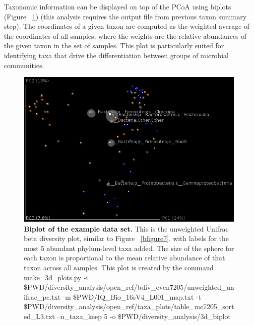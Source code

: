 Taxonomic information can be displayed on top of the PCoA using biplots (Figure ~\ref{bfigure8})
(this analysis requires the output file from previous taxon summary step). The coordinates
of a given taxon are computed as the weighted average of the coordinates of all samples,
where the weights are the relative abundances of the given taxon in the set of samples.
This plot is particularly suited for identifying taxa that drive the differentiation
between groups of microbial communities.

\begin{figure}[htbp]
\includegraphics[width=0.75\columnwidth]{chapter_book_figures/Figure_8.jpg}
\caption[Biplot of the example data set]{\textbf{Biplot of the example data set.}
This is the unweighted Unifrac beta diversity plot, similar to Figure ~\ref{bfigure7},
with labels for the most 5 abundant phylum-level taxa added. The size of the sphere
for each taxon is proportional to the mean relative abundance of that taxon across all
samples. This plot is created by the command make\_3d\_plots.py -i
\$PWD/diversity\_analysis/open\_ref/bdiv\_even7205/unweighted\_unifrac\_pc.txt -m
\$PWD/IQ\_Bio\_16sV4\_L001\_map.txt -t
\$PWD/diversity\_analysis/open\_ref/taxa\_plots/table\_mc7205\_sorted\_L3.txt
--n\_taxa\_keep 5 -o \$PWD/diversity\_analysis/3d\_biplot}
\label{bfigure8}
\end{figure}

